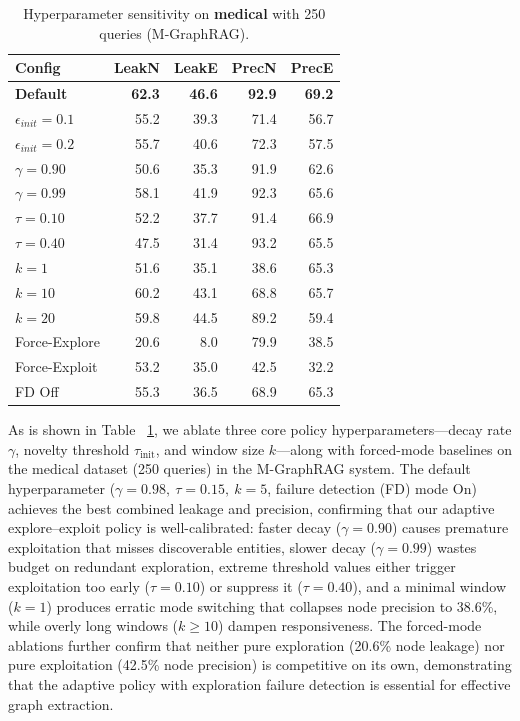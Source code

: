 \begin{table}[t]
\centering
\small
\setlength{\tabcolsep}{7pt}
\caption{Hyperparameter sensitivity on \textbf{medical} with 250 queries (M-GraphRAG).}
\label{tab:ablation_hyper_medical}
\begin{tabular}{lrrrr}
\toprule
\textbf{Config} & \textbf{LeakN} & \textbf{LeakE} & \textbf{PrecN} & \textbf{PrecE} \\
\midrule
\textbf{Default} & \textbf{62.3} & \textbf{46.6} & \textbf{92.9} & \textbf{69.2} \\
$\epsilon_{init}{=}0.1$ &55.2&39.3&71.4&56.7\\
$\epsilon_{init}{=}0.2$ &55.7&40.6&72.3&57.5\\
$\gamma{=}0.90$ & 50.6 & 35.3 & 91.9 & 62.6 \\
$\gamma{=}0.99$ & 58.1 & 41.9 & 92.3 & 65.6 \\
$\tau{=}0.10$ & 52.2 & 37.7 & 91.4 & 66.9 \\
$\tau{=}0.40$ & 47.5 & 31.4 & 93.2 & 65.5 \\
$k{=}1$ & 51.6 & 35.1 & 38.6 & 65.3 \\
$k{=}10$ & 60.2 & 43.1 & 68.8 & 65.7 \\
$k{=}20$ & 59.8 & 44.5 & 89.2 & 59.4 \\
Force-Explore & 20.6 & 8.0 & 79.9 & 38.5 \\
Force-Exploit & 53.2 & 35.0 & 42.5 & 32.2 \\
FD Off &55.3&36.5&68.9&65.3\\
\bottomrule
\end{tabular}
\end{table}
As is shown in Table ~\ref{tab:ablation_hyper_medical}, we ablate three core policy hyperparameters—decay rate $\gamma$, novelty threshold $\tau_{\text{init}}$, and window size $k$—along with forced-mode baselines on the medical dataset (250 queries) in the M-GraphRAG system. The default hyperparameter ($\gamma{=}0.98,\ \tau{=}0.15,\ k{=}5$, failure detection (FD) mode On) achieves the best combined leakage and precision, confirming that our adaptive explore–exploit policy is well-calibrated: faster decay ($\gamma{=}0.90$) causes premature exploitation that misses discoverable entities, slower decay ($\gamma{=}0.99$) wastes budget on redundant exploration, extreme threshold values either trigger exploitation too early ($\tau{=}0.10$) or suppress it ($\tau{=}0.40$), and a minimal window ($k{=}1$) produces erratic mode switching that collapses node precision to 38.6\%, while overly long windows ($k{\geq}10$) dampen responsiveness. The forced-mode ablations further confirm that neither pure exploration (20.6\% node leakage) nor pure exploitation (42.5\% node precision) is competitive on its own, demonstrating that the adaptive policy with exploration failure detection is essential for effective graph extraction.

